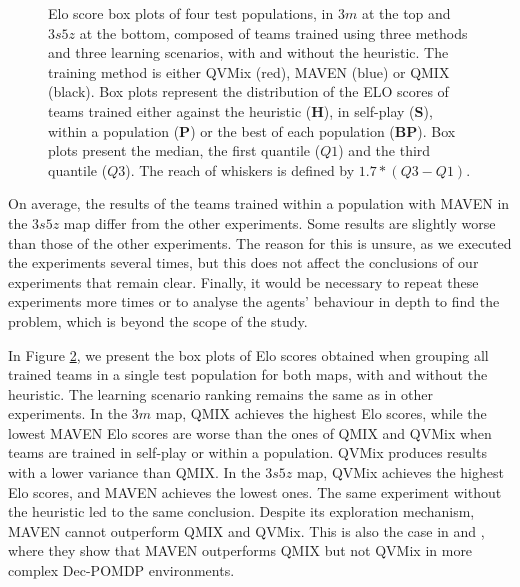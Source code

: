 \begin{figure}[ht]
\begin{subfigure}{\textwidth}
\label{subfig:3s5z_all_no_h}
\end{subfigure}
\caption{
Elo score box plots of four test populations, in $3m$ at the top and $3s5z$ at the bottom, composed of teams trained using three methods and three learning scenarios, with and without the heuristic.
The training method is either QVMix (red), MAVEN (blue) or QMIX (black).
Box plots represent the distribution of the ELO scores of teams trained either against the heuristic (\textbf{H}), in self-play (\textbf{S}), within a population (\textbf{P}) or the best of each population (\textbf{BP}).
Box plots present the median, the first quantile ($Q1$) and the third quantile ($Q3$). The reach of whiskers is defined by $1.7*(Q3-Q1)$.
}
\label{fig:all}
\end{figure}

On average, the results of the teams trained within a population with MAVEN in the $3s5z$ map differ from the other experiments. 
Some results are slightly worse than those of the other experiments.
The reason for this is unsure, as we executed the experiments several times, but this does not affect the conclusions of our experiments that remain clear.
Finally, it would be necessary to repeat these experiments more times or to analyse the agents' behaviour in depth to find the problem, which is beyond the scope of the study. 

In Figure \ref{fig:all}, we present the box plots of Elo scores obtained when grouping all trained teams in a single test population for both maps, with and without the heuristic.
The learning scenario ranking remains the same as in other experiments.
In the $3m$ map, QMIX achieves the highest Elo scores, while the lowest MAVEN Elo scores are worse than the ones of QMIX and QVMix when teams are trained in self-play or within a population.
QVMix produces results with a lower variance than QMIX.
In the $3s5z$ map, QVMix achieves the highest Elo scores, and MAVEN achieves the lowest ones.
The same experiment without the heuristic led to the same conclusion.
Despite its exploration mechanism, MAVEN cannot outperform QMIX and QVMix.
This is also the case in \citep{Mahajan2019MAVEN:Exploration} and \citep{leroy2020qvmix}, where they show that MAVEN outperforms QMIX but not QVMix in more complex Dec-POMDP environments.



